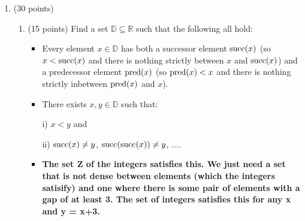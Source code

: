 \documentclass[12pt]{article}
\newcommand{\D}{{\mathbb D}}
\newcommand{\R}{{\mathbb R}}
\newcommand{\succc}{{\rm succ}}
\newcommand{\pred}{{\rm pred}}
\begin{document}
\begin{enumerate}
\begin{enumerate}
\begin{itemize}
    \item \textbf{Let's choose some number N that is that is the sum of 15 4th powers and is 15 mod 16. Therefore, each 4th power has to be odd. But if we look for each odd number mod 32, they have to be either 1 or 17, alternating between the two. So that works. But for even numbers that are raised to the 4th power, N mod 16 would be 0 since each 4th power contributes 0. Therefore, we can write N as 16 times each $y_i$ if $x_i == 2y_i$ for some integer $y_i$. So to the 4th, we would get a factor of 16 for each y, which can be taken out of the sum. Dividing the sum by 16 would give us N/16, which is also then represented as the sum of 15th 4th powers. Now assume we have some number M that isn't representable by 15th 4th powers. If we multiply M by 16, we would get a number that also isn't representable by 15th 4th powers, because if it was, we could divide it by 16 and also get a number M which is represented by 15 4th powers, which contradicts our initial condition for M. Therefore, there an infinite number of numbers that can't be represented by by the sum of 15th 4th powers.}
\end{itemize}
\end{enumerate}


\vfill

\centerline{\bf GO TO NEXT PAGE}

\newpage

\item
(30 points)


\begin{enumerate}
\item
(15 points) 
Find a set $\D\subseteq\R$ such that the following all hold:

\begin{itemize}
\item
Every element $x\in \D$ has both a successor element $\succc(x)$ (so $x<\succc(x)$ 
and there is nothing strictly between $x$ and $\succc(x)$)
and a predecessor element $\pred(x)$ (so $\pred(x)<x$ and there is nothing strictly
inbetween $\pred(x)$ and $x$). 
\item 
There exists $x,y\in\D$ such that:  

i) $x<y$ and 

ii) $\succc(x)\ne y$, $\succc(\succc(x))\ne y$, $\ldots$. 

\item \textbf{The set Z of the integers satisfies this. We just need a set that is not dense between elements (which the integers satisify) and one where there is some pair of elements with a gap of at least 3. The set of integers satisfies this for any x and y = x+3.}


\end{itemize}
\end{enumerate}
\end{enumerate}
\end{document}
